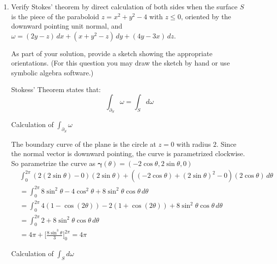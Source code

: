 \documentclass{article}
\begin{document}
\begin{enumerate}
    \newpage
    \item Verify Stokes' theorem by direct calculation of both sides when 
    the surface $S$ is the piece of the paraboloid $z= x^2 + y^2 - 4$ with 
    $z \leq 0$, oriented by the downward pointing unit normal, and $\omega 
    = (2y-z)\, dx + (x + y^2 - z)\, dy + (4y-3x)\, dz$.

    As part of your solution, provide a sketch showing the appropriate 
    orientations. (For this question you may draw the sketch by hand 
    or use symbolic algebra software.)

        Stokess' Theorem states that:
        \[ \int_{\partial_S} \omega = \int_S d\omega \]

        Calculation of $\displaystyle \int_{\partial_S} \omega $

        The boundary curve of the plane is the circle at $z = 0$ with radius 
        $2$. Since the normal vector is downward pointing, the curve is 
        parametrized clockwise. So parametrize the curve as 
        $\boldsymbol \gamma(\theta) = (-2\cos \theta, 2\sin \theta, 0)$
        \begin{align*}
            &\int_0^{2\pi} (2(2\sin\theta) - 0)(2\sin \theta) 
            + ((-2\cos \theta) 
            + (2\sin \theta)^2 - 0)(2\cos \theta) \, d\theta \\
            &= \int_0^{2\pi} 8 \sin ^2 \theta - 4 \cos ^2 \theta 
            + 8 \sin^2 \theta \cos \theta \, d \theta \\
            &= \int_0^{2\pi} 4(1 - \cos(2\theta)) - 2 (1 + \cos(2\theta)) 
            + 8 \sin^2 \theta \cos \theta \, d \theta \\
            &= \int_0^{2\pi} 2 + 8 \sin^2 \theta \cos \theta \, d \theta \\
            &= 4\pi + \bigg[\frac{8\sin^3\theta}{3}\bigg]_0^{2\pi} = 4\pi
        \end{align*}

        Calculation of $\displaystyle \int_{S} d\omega$
        

\end{enumerate}
\end{document}
